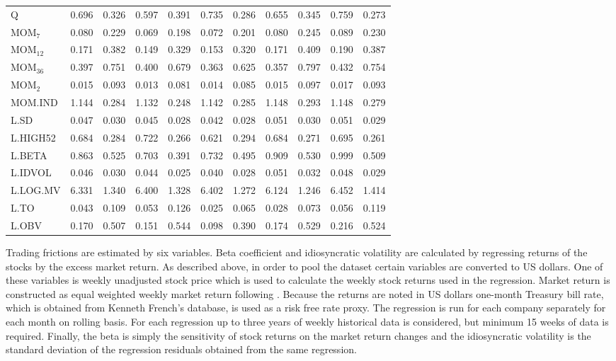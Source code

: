 \documentclass[12pt]{article}
\begin{document}
\begin{table}[ht]
\begin{tabularx}{\textwidth}{@{\extracolsep{1pt}} X r r r r r r r r r r}
Q			& 0.696 	& 0.326	& 0.597 	& 0.391	& 0.735	& 0.286	& 0.655	& 0.345	& 0.759 	& 0.273 \\
MOM$_{7}$ 	& 0.080 	& 0.229	& 0.069 	& 0.198	& 0.072	& 0.201	& 0.080	& 0.245	& 0.089	& 0.230 \\
MOM$_{12}$ 	& 0.171	& 0.382	& 0.149 	& 0.329	& 0.153	& 0.320	& 0.171	& 0.409	& 0.190	& 0.387 \\
MOM$_{36}$ 	& 0.397	& 0.751	& 0.400 	& 0.679	& 0.363	& 0.625	& 0.357	& 0.797	& 0.432	& 0.754 \\
MOM$_{2}$ 	& 0.015 	& 0.093	& 0.013 	& 0.081	& 0.014	& 0.085	& 0.015	& 0.097	& 0.017	& 0.093 \\ 
MOM.IND 	& 1.144 	& 0.284	& 1.132 	& 0.248	& 1.142	& 0.285	& 1.148	& 0.293	& 1.148	& 0.279 \\
L.SD	 		& 0.047	& 0.030	& 0.045 	& 0.028	& 0.042	& 0.028	& 0.051	& 0.030	& 0.051	& 0.029 \\
L.HIGH52		& 0.684 	& 0.284	& 0.722 	& 0.266	& 0.621	& 0.294	& 0.684	& 0.271	& 0.695	& 0.261 \\
L.BETA	 	& 0.863 	& 0.525	& 0.703 	& 0.391	& 0.732	& 0.495	& 0.909	& 0.530	& 0.999	& 0.509 \\
L.IDVOL	 	& 0.046 	& 0.030	& 0.044 	& 0.025	& 0.040	& 0.028	& 0.051	& 0.032	& 0.048	& 0.029 \\ 
L.LOG.MV	& 6.331  	& 1.340	& 6.400 	& 1.328	& 6.402	& 1.272	& 6.124	& 1.246	& 6.452	& 1.414 \\ 
L.TO		 	& 0.043  	& 0.109	& 0.053 	& 0.126	& 0.025	& 0.065	& 0.028	& 0.073	& 0.056	& 0.119 \\
L.OBV		& 0.170 	& 0.507	& 0.151 	& 0.544	& 0.098	& 0.390	& 0.174	& 0.529	& 0.216	& 0.524 \\ 
\bottomrule
\end{tabularx}
\end{table} 

Trading frictions are estimated by six variables. Beta coefficient and idiosyncratic volatility are calculated by regressing returns of the stocks by the excess market return. As described above, in order to pool the dataset certain variables are converted to US dollars. One of these variables is weekly unadjusted stock price which is used to calculate the weekly stock returns used in the regression. Market return is constructed as equal weighted weekly market return following \citet*{Green2017}. Because the returns are noted in US dollars one-month Treasury bill rate, which is obtained from Kenneth French's database\footnotemark, is used as a risk free rate proxy. The regression is run for each company separately for each month on rolling basis. For each regression up to three years of weekly historical data is considered, but minimum 15 weeks of data is required. Finally, the beta is simply the sensitivity of stock returns on the market return changes and the idiosyncratic volatility is the standard deviation of the regression residuals obtained from the same regression. \par
\end{document}
